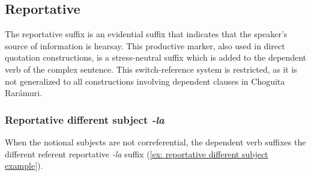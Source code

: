 \subsection{Reportative}
\label{subusec: reportative}
\largerpage
The reportative suffix is an evidential suffix that indicates that the speaker’s source of information is hearsay. This productive marker, also used in direct quotation constructions, is a stress-neutral suffix which is added to the dependent verb of the complex sentence.  This switch-reference system is restricted, as it is not generalized to all constructions involving dependent clauses in Choguita Rarámuri.

\subsubsection{Reportative different subject \textit{-la}}
\label{subsubsec: reportative different subject}

When the notional subjects are not correferential, the dependent verb suffixes the different referent reportative \textit{-la} suffix (\ref{ex: reportative different subject example}).

\ea\label{ex: reportative different subject example}

